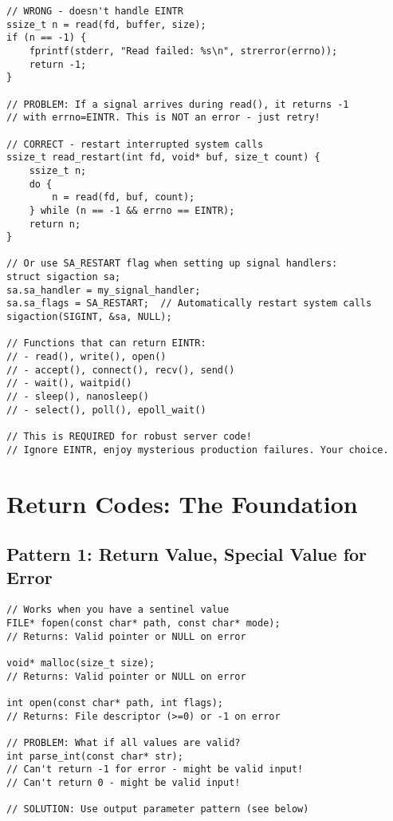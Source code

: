 \begin{lstlisting}
// WRONG - doesn't handle EINTR
ssize_t n = read(fd, buffer, size);
if (n == -1) {
    fprintf(stderr, "Read failed: %s\n", strerror(errno));
    return -1;
}

// PROBLEM: If a signal arrives during read(), it returns -1
// with errno=EINTR. This is NOT an error - just retry!

// CORRECT - restart interrupted system calls
ssize_t read_restart(int fd, void* buf, size_t count) {
    ssize_t n;
    do {
        n = read(fd, buf, count);
    } while (n == -1 && errno == EINTR);
    return n;
}

// Or use SA_RESTART flag when setting up signal handlers:
struct sigaction sa;
sa.sa_handler = my_signal_handler;
sa.sa_flags = SA_RESTART;  // Automatically restart system calls
sigaction(SIGINT, &sa, NULL);

// Functions that can return EINTR:
// - read(), write(), open()
// - accept(), connect(), recv(), send()
// - wait(), waitpid()
// - sleep(), nanosleep()
// - select(), poll(), epoll_wait()

// This is REQUIRED for robust server code!
// Ignore EINTR, enjoy mysterious production failures. Your choice.
\end{lstlisting}

\section{Return Codes: The Foundation}

\subsection{Pattern 1: Return Value, Special Value for Error}

\begin{lstlisting}
// Works when you have a sentinel value
FILE* fopen(const char* path, const char* mode);
// Returns: Valid pointer or NULL on error

void* malloc(size_t size);
// Returns: Valid pointer or NULL on error

int open(const char* path, int flags);
// Returns: File descriptor (>=0) or -1 on error

// PROBLEM: What if all values are valid?
int parse_int(const char* str);
// Can't return -1 for error - might be valid input!
// Can't return 0 - might be valid input!

// SOLUTION: Use output parameter pattern (see below)
\end{lstlisting}

